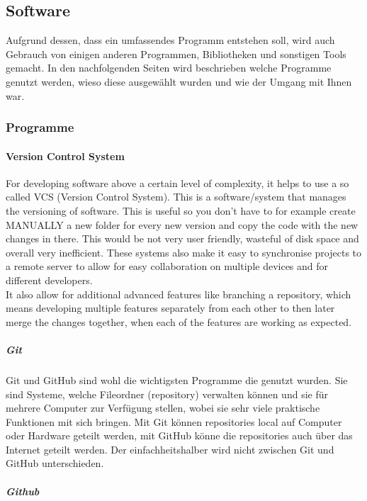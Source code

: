 \documentclass[a4paper,11pt]{article}
\begin{document}
\subsection{Software}

Aufgrund dessen, dass ein umfassendes Programm entstehen soll, wird auch Gebrauch von einigen anderen Programmen, Bibliotheken und sonstigen Tools gemacht. In den nachfolgenden Seiten wird beschrieben welche Programme genutzt werden, wieso diese ausgewählt wurden und wie der Umgang mit Ihnen war.  


\subsubsection{Programme}

\paragraph{Version Control System}

For developing software above a certain level of complexity, it helps to use a so called VCS (Version Control System). This is a software/system that manages the versioning of software. This is useful so you don't have to for example create MANUALLY a new folder for every new version and copy the code with the new changes in there. This would be not very user friendly, wasteful of disk space and overall very inefficient. These systems also make it easy to synchronise projects to a remote server to allow for easy collaboration on multiple devices and for different developers.\\

It also allow for additional advanced features like branching a repository, which means developing multiple features separately from each other to then later merge the changes together, when each of the features are working as expected.

\subparagraph{Git}

Git und GitHub sind wohl die wichtigsten Programme die genutzt wurden. Sie sind Systeme, welche Fileordner (repository) verwalten können und sie für mehrere Computer zur Verfügung stellen, 
wobei sie sehr viele praktische Funktionen mit sich bringen. Mit Git können repositories local auf Computer oder Hardware geteilt werden, mit GitHub könne die repositories auch 
über das Internet geteilt werden. Der einfachheitshalber wird nicht zwischen Git und GitHub unterschieden. 

\subparagraph{Github}
\end{document}
